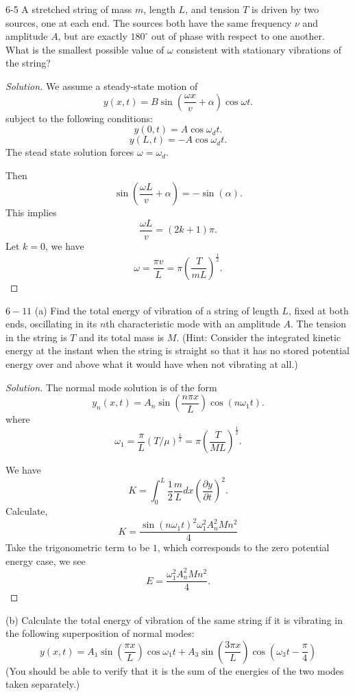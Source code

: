\newpage

6-5 A stretched string of mass $m$, length $L$, and tension $T$ is driven by two sources, one at each end. The sources both have the same frequency $\nu$ and amplitude $A$, but are exactly $180^{\circ}$ out of phase with respect to one another. What is the smallest possible value of $\omega$ consistent with stationary vibrations of the string?
\begin{proof}[Solution]
	We assume a steady-state motion of
	\[
		y(x,t) = B \sin(\frac{\omega x}{v}  + \alpha) \cos \omega t
	.\] 
	subject to the following conditions:
	\[
		y(0,t) = A \cos \omega_d t 
	.\] 
	\[
		y(L,t) = -A \cos \omega_d t
	.\] 
	The stead state solution forces $\omega = \omega_d$. 

	Then
	\[
		\sin (\frac{\omega L}{v} + \alpha) = - \sin (\alpha)
	.\] 
	This implies
	\[
		\frac{\omega L}{v} = (2 k+1) \pi
	.\] 
	Let $k = 0$, we have
	\[
		\omega = \frac{\pi v}{L} = \pi \left( \frac{T}{m L} \right) ^{\frac{1}{2}}
	.\] 
\end{proof}

\newpage

$6-11$ (a) Find the total energy of vibration of a string of length $L$, fixed at both ends, oscillating in its $n$th characteristic mode with an amplitude $A$. The tension in the string is $T$ and its total mass is $M$. (Hint: Consider the integrated kinetic energy at the instant when the string is straight so that it has no stored potential energy over and above what it would have when not vibrating at all.)
\begin{proof}[Solution]
	The normal mode solution is of the form
	\[
		y_n(x,t) = A_n \sin\left( \frac{n \pi x}{L} \right)  \cos\left( n \omega_1 t \right) 
	.\] 
	where
	\[
		\omega_1 = \frac{\pi}{L} \left( T / \mu \right) ^{\frac{1}{2}} = \pi \left( \frac{T}{M L} \right) ^{\frac{1}{2}}
	.\] 

	We have
	\[
		K = \int _0^L \frac{1}{2} \frac{m}{L}dx \left( \frac{\partial y}{\partial t}  \right) ^2
	.\] 
	Calculate,
	\[
		K = \frac{\sin \left(n \omega_1 t\right)^2 \omega_1^2 A_n^2 M n^2}{4}
	\]
	Take the trigonometric term to be $1$, which corresponds to the zero potential energy case, we see
	\[
		E = \frac{\omega_1^2 A_n^2 M n^2}{4}
	.\] 

\end{proof}

(b) Calculate the total energy of vibration of the same string if it is vibrating in the following superposition of normal modes:
\[
y(x, t)=A_1 \sin \left(\frac{\pi x}{L}\right) \cos \omega_1 t+A_3 \sin \left(\frac{3 \pi x}{L}\right) \cos \left(\omega_3 t-\frac{\pi}{4}\right)
\]
(You should be able to verify that it is the sum of the energies of the two modes taken separately.)

